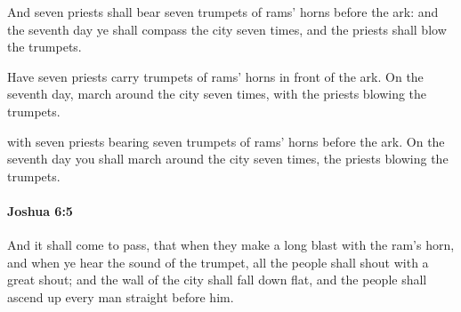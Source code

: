 			\begin{versebox}
					\item[BHS] 
					\item[ASV] And seven priests shall bear seven trumpets of rams' horns before the ark: and the seventh day ye shall compass the city seven times, and the priests shall blow the trumpets.
					\item[NIV] Have seven priests carry trumpets of rams’ horns in front of the ark. On the seventh day, march around the city seven times, with the priests blowing the trumpets.
					\item[NRSV] with seven priests bearing seven trumpets of rams’ horns before the ark. On the seventh day you shall march around the city seven times, the priests blowing the trumpets.
			\end{versebox}

		\paragraph{Joshua 6:5} %
			\label{JOSHUA-6-5}

			And it shall come to pass, that when they make a long blast with the ram’s horn, and when ye hear the sound of the trumpet, all the people shall shout with a great shout; and the wall of the city shall fall down flat, and the people shall ascend up every man straight before him.

